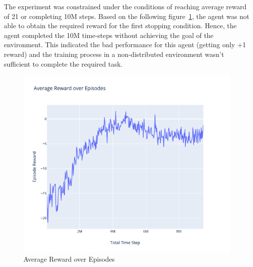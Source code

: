 The experiment was constrained under the conditions of reaching average reward of 21 or completing 10M steps. Based on the following figure~\ref{fig:1st_exp_avg_eps_reward}, the agent was not able to obtain the required reward for the first stopping condition. Hence, the agent completed the 10M time-steps without achieving the goal of the environment. This indicated the bad performance for this agent (getting only +1 reward) and the training process in a non-distributed environment wasn't sufficient to complete the required task.
\begin{figure}[H]
	\centering
	\includegraphics[width=\linewidth]{figures/exps/1st_exp/avg_eps_reward}
	\caption{Average Reward over Episodes}
	\label{fig:1st_exp_avg_eps_reward}
\end{figure}

